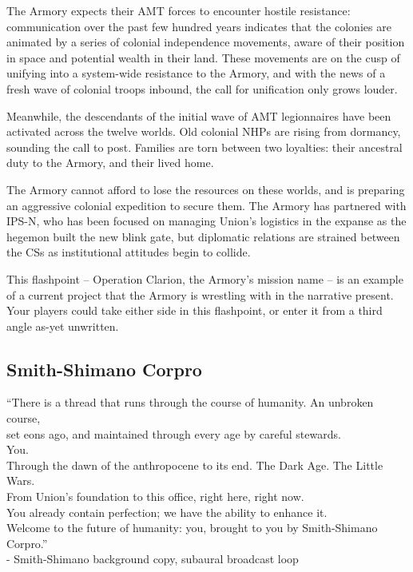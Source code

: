 The Armory expects their AMT forces to encounter hostile resistance: communication over the
past few hundred years indicates that the colonies are animated by a series of colonial
independence movements, aware of their position in space and potential wealth in their land.
These movements are on the cusp of unifying into a system-wide resistance to the Armory, and
with the news of a fresh wave of colonial troops inbound, the call for unification only grows
louder.

Meanwhile, the descendants of the initial wave of AMT legionnaires have been activated across
the twelve worlds. Old colonial NHPs are rising from dormancy, sounding the call to post.
Families are torn between two loyalties: their ancestral duty to the Armory, and their lived home.

The Armory cannot afford to lose the resources on these worlds, and is preparing an aggressive
colonial expedition to secure them. The Armory has partnered with IPS-N, who has been focused
on managing Union’s logistics in the expanse as the hegemon built the new blink gate, but
diplomatic relations are strained between the CSs as institutional attitudes begin to collide.

This flashpoint -- Operation Clarion, the Armory’s mission name -- is an example of a current
project that the Armory is wrestling with in the narrative present. Your players could take either
side in this flashpoint, or enter it from a third angle as-yet unwritten.

\subsection{Smith-Shimano Corpro}
\begin{loreQuote}
         “There is a thread that runs through the course of humanity. An unbroken course,\\
         set eons ago, and maintained through every age by careful stewards.\\

         You.\\

         Through the dawn of the anthropocene to its end. The Dark Age. The Little Wars.\\
         From Union’s foundation to this office, right here, right now.\\

         You already contain perfection; we have the ability to enhance it.\\

         Welcome to the future of humanity: you, brought to you by Smith-Shimano Corpro.”\\

         \quad - \textnormal{Smith-Shimano background copy, subaural broadcast loop}
\end{loreQuote}

